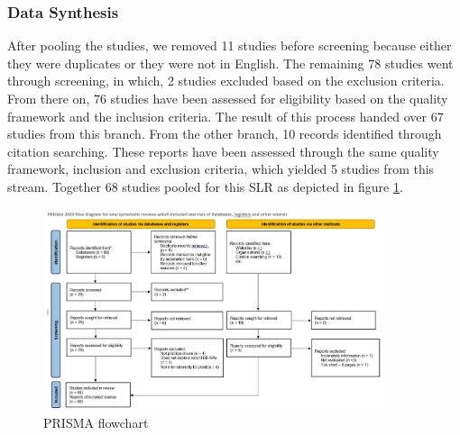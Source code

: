 \documentclass[review]{elsarticle}
\begin{document}


\subsubsection{Data Synthesis}

After pooling the studies, we removed 11 studies before screening because either they were duplicates or they were not in English. The remaining 78 studies went through screening, in which, 2 studies excluded based on the exclusion criteria. From there on, 76 studies have been assessed for eligibility based on the quality framework and the inclusion criteria. The result of this process handed over 67 studies from this branch. From the other branch, 10 records identified through citation searching. These reports have been assessed through the same quality framework, inclusion and exclusion criteria, which yielded 5 studies from this stream. Together 68 studies pooled for this SLR as depicted in figure \ref{fig:PRISMA}.

\begin{figure}[h!]
    \centering
    \includegraphics[width=10cm]{PRISMA.JPG}
    \caption{PRISMA flowchart}
    \label{fig:PRISMA}
\end{figure}
\end{document}
